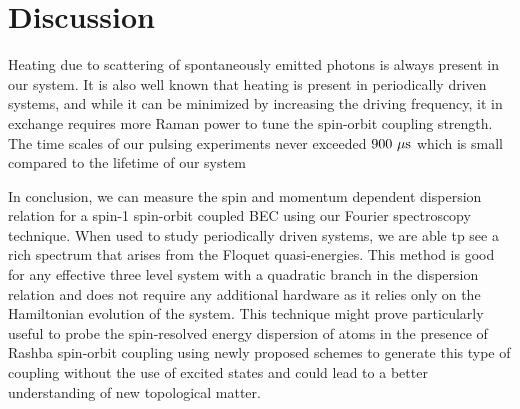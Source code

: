 \section{Discussion}


Heating due to scattering of spontaneously emitted photons is always present in our system. It is also well known that heating is present in periodically driven systems, and while it can be minimized by increasing the driving frequency, it in exchange requires more Raman power to tune the spin-orbit coupling strength. The time scales of our pulsing experiments never exceeded $900{\ \mu{\rm s}}$ which is small compared to the lifetime of our system

In conclusion, we can measure the spin and momentum dependent dispersion relation for a spin-1 spin-orbit coupled BEC using our Fourier spectroscopy technique. When used to study periodically driven systems, we are able tp see a rich spectrum that arises from the Floquet quasi-energies. This method is good for any effective three level system with a quadratic branch in the dispersion relation and does not require any additional hardware as it relies only on the Hamiltonian evolution of the system.  This technique might prove particularly useful to probe the spin-resolved energy dispersion of atoms in the presence of Rashba spin-orbit coupling using newly proposed schemes to generate this type of coupling without the use of excited states and could lead to a better understanding of new topological matter. 
